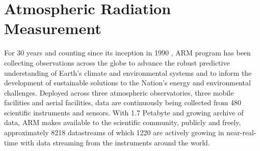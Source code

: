 \section{Atmospheric Radiation Measurement}
For 30 years and counting since its inception in 1990
\cite{Turner_AMS_2016}, ARM program has
been collecting observations across the globe to advance the robust
predictive understanding of Earth's climate and environmental systems
and to inform the development of sustainable solutions to the Nation's
energy and environmental challenges. Deployed across three atmospheric
observatories, three mobile facilities and aerial facilities, data are
continuously being collected from 480 scientific instruments and
sensors. With 1.7 Petabyte and growing archive of data, ARM makes
available to the scientific community, publicly and freely,
approximately 8218 datastreams of which 1220 are actively growing in
near-real-time with data streaming from the instruments around the
world. 

